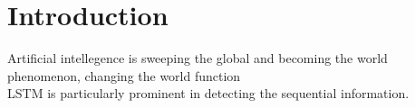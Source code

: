 \section{Introduction}
Artificial intellegence is sweeping the global and becoming the world phenomenon, changing the world function
\\
LSTM is particularly prominent in detecting the sequential information. 
